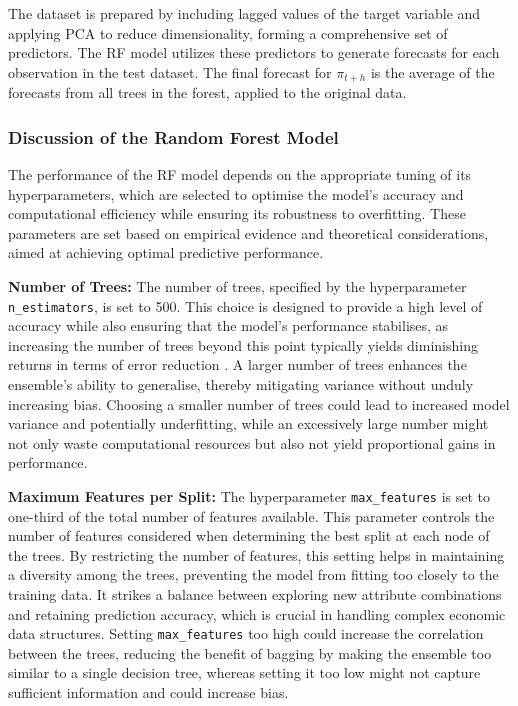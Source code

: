 The dataset is prepared by including lagged values of the target variable and applying PCA to reduce dimensionality, forming a comprehensive set of predictors. The RF model utilizes these predictors to generate forecasts for each observation in the test dataset. The final forecast for $\pi_{t+h}$ is the average of the forecasts from all trees in the forest, applied to the original data. 

\subsubsection*{Discussion of the Random Forest Model}

The performance of the RF model depends on the appropriate tuning of its hyperparameters, which are selected to optimise the model's accuracy and computational efficiency while ensuring its robustness to overfitting. These parameters are set based on empirical evidence and theoretical considerations, aimed at achieving optimal predictive performance.

\noindent \textbf{Number of Trees:} The number of trees, specified by the hyperparameter \texttt{n\_estimators}, is set to 500. This choice is designed to provide a high level of accuracy while also ensuring that the model's performance stabilises, as increasing the number of trees beyond this point typically yields diminishing returns in terms of error reduction \autocite{Medeiros2021ForecastingMethods}. A larger number of trees enhances the ensemble's ability to generalise, thereby mitigating variance without unduly increasing bias. Choosing a smaller number of trees could lead to increased model variance and potentially underfitting, while an excessively large number might not only waste computational resources but also not yield proportional gains in performance.

\noindent \textbf{Maximum Features per Split:} The hyperparameter \texttt{max\_features} is set to one-third of the total number of features available. This parameter controls the number of features considered when determining the best split at each node of the trees. By restricting the number of features, this setting helps in maintaining a diversity among the trees, preventing the model from fitting too closely to the training data. It strikes a balance between exploring new attribute combinations and retaining prediction accuracy, which is crucial in handling complex economic data structures. Setting \texttt{max\_features} too high could increase the correlation between the trees, reducing the benefit of bagging by making the ensemble too similar to a single decision tree, whereas setting it too low might not capture sufficient information and could increase bias.

